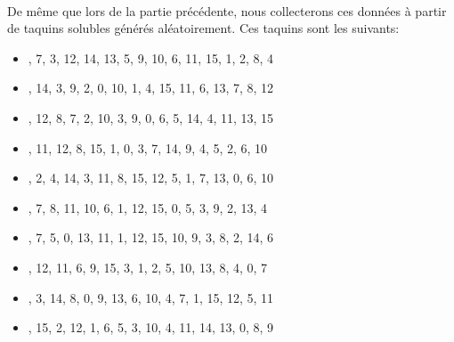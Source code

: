 \documentclass[10pt,a4paper]{report}
\begin{document}
\paragraph{}{De même que lors de la partie précédente, nous collecterons ces données à partir de taquins solubles générés aléatoirement. Ces taquins sont les suivants:}
\begin{itemize}
\item {\ttfamily{},  7,  3, 12, 14, 13,  5,  9, 10,  6, 11, 15,  1,  2,  8,  4\rbrack}
\item {\ttfamily{}, 14,  3,  9,  2,  0, 10,  1,  4, 15, 11,  6, 13,  7,  8, 12\rbrack}
\item {\ttfamily{}, 12,  8,  7,  2, 10,  3,  9,  0,  6,  5, 14,  4, 11, 13, 15\rbrack}
\item {\ttfamily{}, 11, 12,  8, 15,  1,  0,  3,  7, 14,  9,  4,  5,  2,  6, 10\rbrack}
\item {\ttfamily{},  2,  4, 14,  3, 11,  8, 15, 12,  5,  1,  7, 13,  0,  6, 10\rbrack}
\item {\ttfamily{},  7,  8, 11, 10,  6,  1, 12, 15,  0,  5,  3,  9,  2, 13,  4\rbrack}
\item {\ttfamily{},  7,  5,  0, 13, 11,  1, 12, 15, 10,  9,  3,  8,  2, 14,  6\rbrack}
\item {\ttfamily{}, 12, 11,  6,  9, 15,  3,  1,  2,  5, 10, 13,  8,  4,  0,  7\rbrack}
\item {\ttfamily{},  3, 14,  8,  0,  9, 13,  6, 10,  4,  7,  1, 15, 12,  5, 11\rbrack}
\item {\ttfamily{}, 15,  2, 12,  1,  6,  5,  3, 10,  4, 11, 14, 13,  0,  8,  9\rbrack}
\end{itemize}
\end{document}
